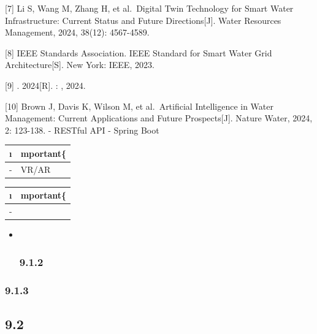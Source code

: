 {[}7{]} Li S, Wang M, Zhang H, et al.~Digital Twin Technology for Smart
Water Infrastructure: Current Status and Future Directions{[}J{]}. Water
Resources Management, 2024, 38(12): 4567-4589.

{[}8{]} IEEE Standards Association. IEEE Standard for Smart Water Grid
Architecture{[}S{]}. New York: IEEE, 2023.

{[}9{]} . 2024{[}R{]}. : , 2024.

{[}10{]} Brown J, Davis K, Wilson M, et al.~Artificial Intelligence in
Water Management: Current Applications and Future Prospects{[}J{]}.
Nature Water, 2024, 2: 123-138. - RESTful API - Spring Boot

\begin{longtable}[]{@{}ll@{}}
\toprule\noalign{}
\i & mportant\{} \\
\midrule\noalign{}
\endhead
\bottomrule\noalign{}
\endlastfoot
- & VR/AR \\
\end{longtable}

\begin{longtable}[]{@{}ll@{}}
\toprule\noalign{}
\i & mportant\{} \\
\midrule\noalign{}
\endhead
\bottomrule\noalign{}
\endlastfoot
- & \important{} \\
\end{longtable}

\begin{itemize}
\item ~
  \hypertarget{section-19}{%
  \subsubsection{9.1.2}\label{section-19}}
\end{itemize}





\hypertarget{section-20}{%
\subsubsection{9.1.3}\label{section-20}}





\hypertarget{section-21}{%
\subsection{9.2}\label{section-21}}

